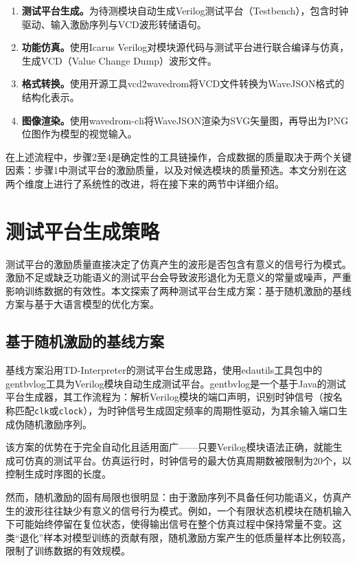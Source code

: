 \begin{enumerate}
  \item \textbf{测试平台生成。}为待测模块自动生成Verilog测试平台（Testbench），包含时钟驱动、输入激励序列与VCD波形转储语句。
  \item \textbf{功能仿真。}使用Icarus Verilog对模块源代码与测试平台进行联合编译与仿真，生成VCD（Value Change Dump）波形文件。
  \item \textbf{格式转换。}使用开源工具vcd2wavedrom将VCD文件转换为WaveJSON格式的结构化表示。
  \item \textbf{图像渲染。}使用wavedrom-cli将WaveJSON渲染为SVG矢量图，再导出为PNG位图作为模型的视觉输入。
\end{enumerate}

在上述流程中，步骤2至4是确定性的工具链操作，合成数据的质量取决于两个关键因素：步骤1中测试平台的激励质量，以及对候选模块的质量预选。本文分别在这两个维度上进行了系统性的改进，将在接下来的两节中详细介绍。


\section{测试平台生成策略}

测试平台的激励质量直接决定了仿真产生的波形是否包含有意义的信号行为模式。激励不足或缺乏功能语义的测试平台会导致波形退化为无意义的常量或噪声，严重影响训练数据的有效性。本文探索了两种测试平台生成方案：基于随机激励的基线方案与基于大语言模型的优化方案。


\subsection{基于随机激励的基线方案}

基线方案沿用TD-Interpreter的测试平台生成思路，使用edautils工具包中的gentbvlog工具为Verilog模块自动生成测试平台。gentbvlog是一个基于Java的测试平台生成器，其工作流程为：解析Verilog模块的端口声明，识别时钟信号（按名称匹配\texttt{clk}或\texttt{clock}），为时钟信号生成固定频率的周期性驱动，为其余输入端口生成伪随机激励序列。

该方案的优势在于完全自动化且适用面广——只要Verilog模块语法正确，就能生成可仿真的测试平台。仿真运行时，时钟信号的最大仿真周期数被限制为20个，以控制生成时序图的长度。

然而，随机激励的固有局限也很明显：由于激励序列不具备任何功能语义，仿真产生的波形往往缺少有意义的信号行为模式。例如，一个有限状态机模块在随机输入下可能始终停留在复位状态，使得输出信号在整个仿真过程中保持常量不变。这类“退化”样本对模型训练的贡献有限，随机激励方案产生的低质量样本比例较高，限制了训练数据的有效规模。


